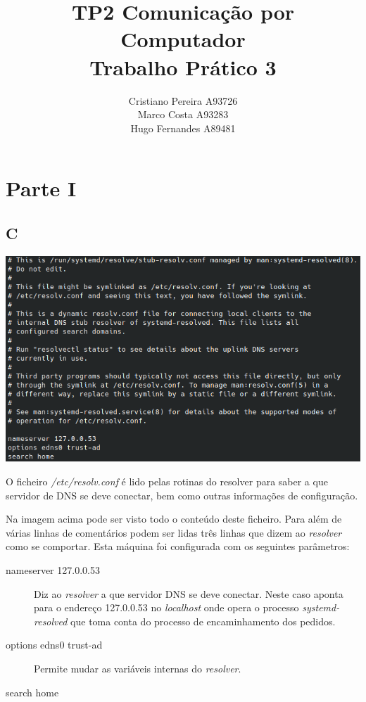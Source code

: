 \documentclass{report}
\title{TP2}
\title{
    Comunicação por Computador \\
    \large{Trabalho Prático 3}
}
\author{
    Cristiano Pereira A93726 \\
    Marco Costa A93283 \\
    Hugo Fernandes A89481
}
\affil{
    Universidade do Minho \\
    Departamento de Informática
}
\begin{document}
    \maketitle
    \newpage

    \section*{Parte I}
        \subsection*{C}
            \noindent
            \includegraphics[width=\textwidth]{images/resolv.conf.png}
            \par
                O ficheiro \textit{/etc/resolv.conf} é lido pelas rotinas do resolver para saber
            a que servidor de DNS se deve conectar, bem como outras informações de configuração.\par 
                Na imagem acima pode ser visto todo o conteúdo deste ficheiro. Para além de várias linhas de comentários
            podem ser lidas três linhas que dizem ao \textit{resolver} como se comportar. Esta máquina foi configurada com os seguintes parâmetros: 
            \begin{description}
                \item[nameserver 127.0.0.53] Diz ao \textit{resolver} a que servidor DNS se deve conectar. Neste caso aponta para o endereço 127.0.0.53 no
                \textit{localhost} onde opera o processo \textit{systemd-resolved} que toma conta do processo de encaminhamento dos pedidos.
                \item[options edns0 trust-ad] Permite mudar as variáveis internas do \textit{resolver}.
                \item[search home]   
            \end{description}
        \pagebreak
\end{document}
